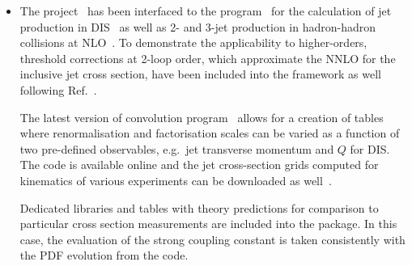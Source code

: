 \begin{itemize}
  \item The \fastnlo project~\cite{Kluge:2006xs} has been interfaced
    to the \nlojetpp program~\cite{Nagy:1998bb} for the calculation of
    jet production in DIS~\cite{Nagy:2001xb} as well as 2- and 3-jet
    production in hadron-hadron collisions at
    NLO~\cite{Nagy:2003tz,Nagy:2001fj}. To demonstrate the
    applicability to higher-orders, threshold corrections at 2-loop
    order, which approximate the NNLO for the inclusive jet cross
    section, have been included into the framework as
    well~\cite{Wobisch:2011ij} following Ref.~\cite{Kidonakis:2000gi}.

    The latest version of \fastnlo convolution program~\cite{Britzger:2012bs} allows for a
    creation of tables where renormalisation and factorisation scales
    can be varied as a function of two pre-defined observables, e.g.\ jet
    transverse momentum \pperp and $Q$ for DIS\@. 
    The \fastnlo code is available online and the
    jet cross-section grids computed for kinematics of various experiments
    can be downloaded as well~\cite{fastNLO:HepForge}.

    Dedicated \fastnlo libraries and tables with theory predictions  for comparison to
    particular cross section measurements are included into the \fitter package. In this
    case, the evaluation of the strong coupling constant is taken
    consistently with the PDF evolution from the \qcdnum code. 
%
%


\end{itemize}
